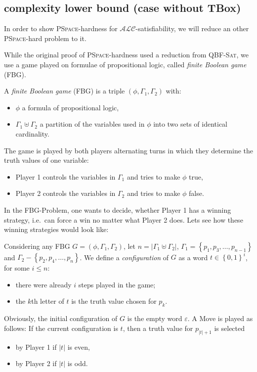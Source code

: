 \subsection{complexity lower bound (case without TBox)}
In order to show  \textsc{PSpace}-hardness for $\mathcal{ALC}$-satisfiability,
we will reduce an other \textsc{PSpace}-hard problem to it.

While the original proof of \textsc{PSpace}-hardness used a reduction from \textsc{QBF-Sat},
we use a game played on formulae of propositional logic, called \textit{finite Boolean game} (FBG).

\begin{definition}[FBG]
	A \textit{finite Boolean game} (FBG) is a triple $(\phi, \Gamma_1, \Gamma_2)$ with:
	\begin{itemize}
		\item $\phi$ a formula of propositional logic,
		\item $\Gamma_1 \uplus \Gamma_2$ a partition of the variables used in $\phi$ into two sets of identical cardinality.
	\end{itemize}
	The game is played by both players alternating turns in which they determine the truth values of one variable:
	\begin{itemize}
		\item Player 1 controls the variables in $\Gamma_1$ and tries to make $\phi$ true,
		\item Player 2 controls the variables in $\Gamma_2$ and tries to make $\phi$ false.
	\end{itemize}
\end{definition}

In the FBG-Problem, one wants to decide, whether Player 1 has a winning strategy,
i.e.\ can force a win no matter what Player 2 does.
Lets see how these winning strategies would look like:

Considering any FBG $G = (\phi, \Gamma_1, \Gamma_2)$, let $n = \lvert \Gamma_1 \uplus \Gamma_2 \rvert$,
$\Gamma_1 = \left\{ p_1, p_3, \ldots, p_{n-1} \right\}$ and $\Gamma_2 - \left\{ p_2, p_4, \ldots, p_n \right\}$.
We define a \textit{configuration} of $G$ as a word $t \in \left\{ 0,1 \right\}^i$, for some $i \leq n$:
\begin{itemize}
	\item there were already $i$ steps played in the game;
	\item the $k$th letter of $t$ is the truth value chosen for $p_k$.
\end{itemize}
Obviously, the initial configuration of $G$ is the empty word $\varepsilon$.
A Move is played as follows:
If the current configuration is  $t$, then a truth value for $p_{\lvert t \rvert + 1}$ is selected
\begin{itemize}
	\item by Player 1 if $\lvert t \rvert$ is even,
	\item by Player 2 if $\lvert t \rvert$ is odd.
\end{itemize}
